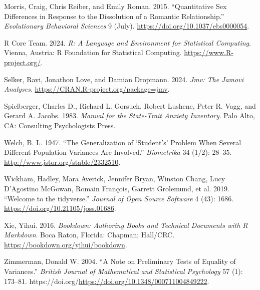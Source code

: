 \documentclass[
]{book}
\newlength{\cslhangindent}
\newenvironment{CSLReferences}[2] %
 {\begin{list}{}{%
  \setlength{\itemindent}{0pt}
  \setlength{\leftmargin}{0pt}
  \setlength{\parsep}{0pt}
  \ifodd #1
   \setlength{\leftmargin}{\cslhangindent}
   \setlength{\itemindent}{-1\cslhangindent}
  \fi
  \setlength{\itemsep}{#2\baselineskip}}}
 {\end{list}}
\theoremstyle{definition}
\theoremstyle{definition}
\theoremstyle{definition}
\theoremstyle{definition}
\theoremstyle{remark}
\begin{document}
\begin{CSLReferences}{1}{0}
Morris, Craig, Chris Reiber, and Emily Roman. 2015. {``Quantitative Sex Differences in Response to the Dissolution of a Romantic Relationship.''} \emph{Evolutionary Behavioral Sciences} 9 (July). \url{https://doi.org/10.1037/ebs0000054}.

R Core Team. 2024. \emph{R: A Language and Environment for Statistical Computing}. Vienna, Austria: R Foundation for Statistical Computing. \url{https://www.R-project.org/}.

Selker, Ravi, Jonathon Love, and Damian Dropmann. 2024. \emph{Jmv: The Jamovi Analyses}. \url{https://CRAN.R-project.org/package=jmv}.

Spielberger, Charles D., Richard L. Gorsuch, Robert Lushene, Peter R. Vagg, and Gerard A. Jacobs. 1983. \emph{Manual for the State-Trait Anxiety Inventory}. Palo Alto, CA: Consulting Psychologists Press.

Welch, B. L. 1947. {``The Generalization of {`Student's'} Problem When Several Different Population Variances Are Involved.''} \emph{Biometrika} 34 (1/2): 28--35. \url{http://www.jstor.org/stable/2332510}.

Wickham, Hadley, Mara Averick, Jennifer Bryan, Winston Chang, Lucy D'Agostino McGowan, Romain François, Garrett Grolemund, et al. 2019. {``Welcome to the {tidyverse}.''} \emph{Journal of Open Source Software} 4 (43): 1686. \url{https://doi.org/10.21105/joss.01686}.

Xie, Yihui. 2016. \emph{Bookdown: Authoring Books and Technical Documents with {R} Markdown}. Boca Raton, Florida: Chapman; Hall/CRC. \url{https://bookdown.org/yihui/bookdown}.

Zimmerman, Donald W. 2004. {``A Note on Preliminary Tests of Equality of Variances.''} \emph{British Journal of Mathematical and Statistical Psychology} 57 (1): 173--81. https://doi.org/\url{https://doi.org/10.1348/000711004849222}.

\end{CSLReferences}
\end{document}
